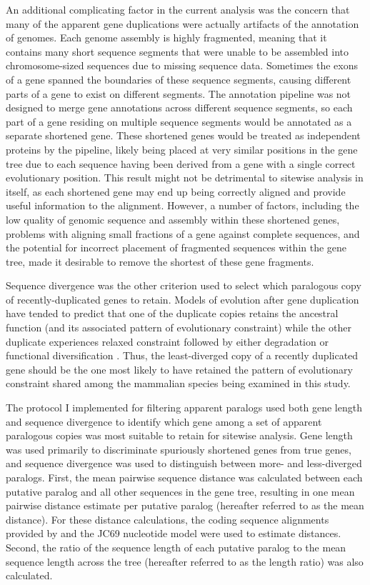 An additional complicating factor in the current analysis was the
concern that many of the apparent gene duplications were actually
artifacts of the annotation of \lcv genomes. Each \lcv genome assembly
is highly fragmented, meaning that it contains many short sequence
segments that were unable to be assembled into chromosome-sized
sequences due to missing sequence data. Sometimes the exons of a gene
spanned the boundaries of these sequence segments, causing different
parts of a gene to exist on different segments. The \ens annotation
pipeline was not designed to merge gene annotations across different
sequence segments, so each part of a gene residing on multiple
sequence segments would be annotated as a separate shortened
gene. These shortened genes would be treated as independent proteins
by the \cmp pipeline, likely being placed at very similar positions in
the gene tree due to each sequence having been derived from a gene
with a single correct evolutionary position. This result might not be
detrimental to sitewise analysis in itself, as each shortened gene may
end up being correctly aligned and provide useful information to the
alignment. However, a number of factors, including the low quality of
genomic sequence and assembly within these shortened genes, problems
with aligning small fractions of a gene against complete sequences,
and the potential for incorrect placement of fragmented sequences
within the gene tree, made it desirable to remove the shortest of
these gene fragments.

Sequence divergence was the other criterion used to select which
paralogous copy of recently-duplicated genes to retain. Models of
evolution after gene duplication have tended to predict that one of the
duplicate copies retains the ancestral function (and its associated
pattern of evolutionary constraint) while the other duplicate
experiences relaxed constraint followed by either degradation or
functional diversification \citep{Han2009}. Thus, the least-diverged
copy of a recently duplicated gene should be the one most likely to
have retained the pattern of evolutionary constraint shared among the
mammalian species being examined in this study.

The protocol I implemented for filtering apparent paralogs used both
gene length and sequence divergence to identify which gene among a set
of apparent paralogous copies was most suitable to retain for sitewise
analysis. Gene length was used primarily to discriminate spuriously
shortened genes from true genes, and sequence divergence was used to
distinguish between more- and less-diverged paralogs. First, the mean
pairwise sequence distance was calculated between each putative
paralog and all other sequences in the gene tree, resulting in one
mean pairwise distance estimate per putative paralog (hereafter
referred to as the mean distance). For these distance calculations,
the coding sequence alignments provided by \ens \cmp and the JC69
nucleotide model were used to estimate distances. Second, the ratio of
the sequence length of each putative paralog to the mean sequence
length across the tree (hereafter referred to as the length ratio) was
also calculated.

